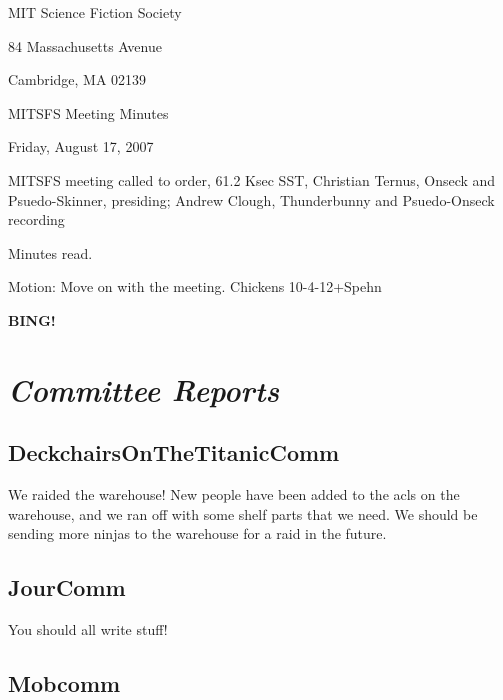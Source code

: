 \documentclass[10pt]{article}
\newcommand{\bing}{{\bf BING!} }
\newcommand{\goto}[1]{\bing \vskip 12pt \section*{{\em{#1}}}}
\begin{document}
\begin{center}

MIT Science Fiction Society

84 Massachusetts Avenue

Cambridge, MA 02139

\vspace{12pt}

MITSFS Meeting Minutes

Friday, August 17, 2007

\end{center}

\vspace{18pt}

\setlength{\parskip}{6pt}

\noindent
MITSFS meeting called to order, 61.2 Ksec SST,
Christian Ternus, Onseck and Psuedo-Skinner, presiding; Andrew Clough, Thunderbunny and Psuedo-Onseck recording

Minutes read.

Motion:  Move on with the meeting.  Chickens 10-4-12+Spehn

\goto{Committee Reports}

\subsection*{DeckchairsOnTheTitanicComm}

We raided the warehouse!  New people have been added to the acls on the warehouse, and we ran off with some shelf parts that we need.  We should be sending more ninjas to the warehouse for a raid in the future.



\subsection*{JourComm}

You should all write stuff!

\subsection*{Mobcomm}
\end{document}

